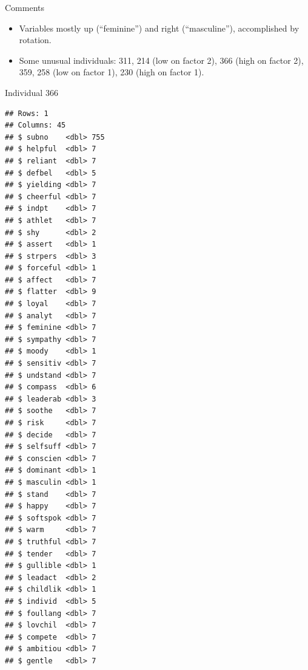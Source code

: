 \documentclass[
  ignorenonframetext,
]{beamer}
\newenvironment{Shaded}{\begin{snugshade}}{\end{snugshade}}
\newcommand{\DecValTok}[1]{\textcolor[rgb]{0.00,0.00,0.81}{#1}}
\newcommand{\KeywordTok}[1]{\textcolor[rgb]{0.13,0.29,0.53}{\textbf{#1}}}
\newcommand{\NormalTok}[1]{#1}
\newcommand{\OperatorTok}[1]{\textcolor[rgb]{0.81,0.36,0.00}{\textbf{#1}}}
\newcommand{\StringTok}[1]{\textcolor[rgb]{0.31,0.60,0.02}{#1}}
\begin{document}
\begin{frame}{Comments}
\protect\hypertarget{comments-40}{}

\begin{itemize}
\item
  Variables mostly up (``feminine'') and right (``masculine''),
  accomplished by rotation.
\item
  Some unusual individuals: 311, 214 (low on factor 2), 366 (high on
  factor 2), 359, 258 (low on factor 1), 230 (high on factor 1).
\end{itemize}

\end{frame}

\begin{frame}[fragile]{Individual 366}
\protect\hypertarget{individual-366}{}

\tiny

\begin{Shaded}
\end{Shaded}

\begin{verbatim}
## Rows: 1
## Columns: 45
## $ subno    <dbl> 755
## $ helpful  <dbl> 7
## $ reliant  <dbl> 7
## $ defbel   <dbl> 5
## $ yielding <dbl> 7
## $ cheerful <dbl> 7
## $ indpt    <dbl> 7
## $ athlet   <dbl> 7
## $ shy      <dbl> 2
## $ assert   <dbl> 1
## $ strpers  <dbl> 3
## $ forceful <dbl> 1
## $ affect   <dbl> 7
## $ flatter  <dbl> 9
## $ loyal    <dbl> 7
## $ analyt   <dbl> 7
## $ feminine <dbl> 7
## $ sympathy <dbl> 7
## $ moody    <dbl> 1
## $ sensitiv <dbl> 7
## $ undstand <dbl> 7
## $ compass  <dbl> 6
## $ leaderab <dbl> 3
## $ soothe   <dbl> 7
## $ risk     <dbl> 7
## $ decide   <dbl> 7
## $ selfsuff <dbl> 7
## $ conscien <dbl> 7
## $ dominant <dbl> 1
## $ masculin <dbl> 1
## $ stand    <dbl> 7
## $ happy    <dbl> 7
## $ softspok <dbl> 7
## $ warm     <dbl> 7
## $ truthful <dbl> 7
## $ tender   <dbl> 7
## $ gullible <dbl> 1
## $ leadact  <dbl> 2
## $ childlik <dbl> 1
## $ individ  <dbl> 5
## $ foullang <dbl> 7
## $ lovchil  <dbl> 7
## $ compete  <dbl> 7
## $ ambitiou <dbl> 7
## $ gentle   <dbl> 7
\end{verbatim}

\normalsize

\end{frame}
\end{document}

